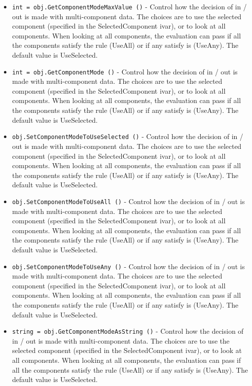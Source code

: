 \begin{itemize}
\item  \verb|int = obj.GetComponentModeMaxValue ()| -  Control how the decision of in / out is made with multi-component data.
 The choices are to use the selected component (specified in the
 SelectedComponent ivar), or to look at all components. When looking at
 all components, the evaluation can pass if all the components satisfy
 the rule (UseAll) or if any satisfy is (UseAny). The default value is
 UseSelected.

\item  \verb|int = obj.GetComponentMode ()| -  Control how the decision of in / out is made with multi-component data.
 The choices are to use the selected component (specified in the
 SelectedComponent ivar), or to look at all components. When looking at
 all components, the evaluation can pass if all the components satisfy
 the rule (UseAll) or if any satisfy is (UseAny). The default value is
 UseSelected.

\item  \verb|obj.SetComponentModeToUseSelected ()| -  Control how the decision of in / out is made with multi-component data.
 The choices are to use the selected component (specified in the
 SelectedComponent ivar), or to look at all components. When looking at
 all components, the evaluation can pass if all the components satisfy
 the rule (UseAll) or if any satisfy is (UseAny). The default value is
 UseSelected.

\item  \verb|obj.SetComponentModeToUseAll ()| -  Control how the decision of in / out is made with multi-component data.
 The choices are to use the selected component (specified in the
 SelectedComponent ivar), or to look at all components. When looking at
 all components, the evaluation can pass if all the components satisfy
 the rule (UseAll) or if any satisfy is (UseAny). The default value is
 UseSelected.

\item  \verb|obj.SetComponentModeToUseAny ()| -  Control how the decision of in / out is made with multi-component data.
 The choices are to use the selected component (specified in the
 SelectedComponent ivar), or to look at all components. When looking at
 all components, the evaluation can pass if all the components satisfy
 the rule (UseAll) or if any satisfy is (UseAny). The default value is
 UseSelected.

\item  \verb|string = obj.GetComponentModeAsString ()| -  Control how the decision of in / out is made with multi-component data.
 The choices are to use the selected component (specified in the
 SelectedComponent ivar), or to look at all components. When looking at
 all components, the evaluation can pass if all the components satisfy
 the rule (UseAll) or if any satisfy is (UseAny). The default value is
 UseSelected.


\end{itemize}
